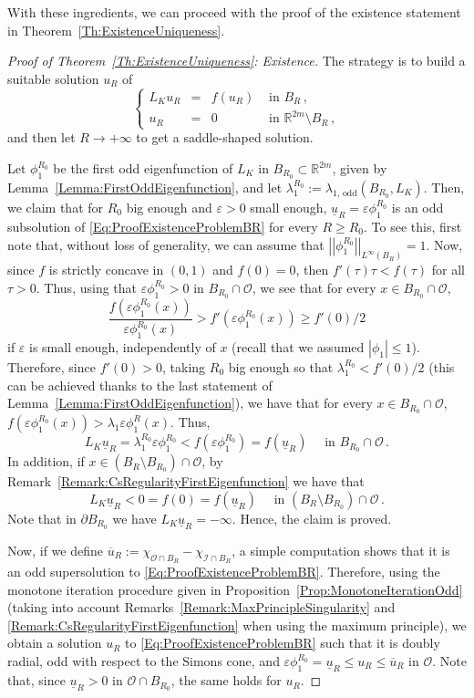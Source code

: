 \documentclass[12pt,reqno]{amsart}
\theoremstyle{definition}
\theoremstyle{remark}
\newcommand{\con}[1]{\mathbb{#1}}
\newcommand{\R}{\con{R}} %
\newcommand{\ical}{\mathcal{I}}
\newcommand{\ocal}{\mathcal{O}}
\newcommand{\norm}[1]{\left | \left |{#1} \right | \right |}
\newcommand\beqc[1]{\left\{\begin{array}{#1}}
\newcommand\eeqc{\end{array} \right.}
\def\PDEsystem{rcll}
\newcommand{\usub}{\underline{u}}
\newcommand{\usup}{\overline{u}}
\numberwithin{equation}{section}
\begin{document}
With these ingredients, we can proceed with the proof of the existence statement in Theorem~\ref{Th:ExistenceUniqueness}.

\begin{proof}[Proof of Theorem~\ref{Th:ExistenceUniqueness}: Existence]
	The strategy is to build a suitable solution $u_R$ of 
	\begin{equation}
	\label{Eq:ProofExistenceProblemBR}
	\beqc{\PDEsystem}
	L_K u_R &=& f(u_R) & \textrm{ in } B_R\,,\\
	u_R &=& 0 & \textrm{ in }\R^{2m} \setminus B_R\,,
	\eeqc
	\end{equation}
	and then let $R\to+ \infty$ to get a saddle-shaped solution.
	
	Let $\phi_1^{R_0}$ be the first odd eigenfunction of $L_K$ in $B_{R_0} \subset \R^{2m}$, given by Lemma~\ref{Lemma:FirstOddEigenfunction}, and let  $\lambda_1^{R_0} := \lambda_{1, \, \mathrm{odd}}(B_{R_0}, L_K)$. Then, we claim that for $R_0$ big enough and $\varepsilon>0$ small enough, $\usub_R = \varepsilon\phi_1^{R_0} $ is an odd subsolution of \eqref{Eq:ProofExistenceProblemBR} for every $R\geq R_0$. To see this, first note that, without loss of generality, we can assume that $\norm{\phi_1^{R_0}}_{L^\infty(B_R)}=1$. Now, since $f$ is strictly concave in $(0,1)$ and $f(0)=0$, then $f'(\tau)\tau<f(\tau)$ for all $\tau>0$. Thus, using that $\varepsilon \phi_1^{R_0}>0$ in $B_{R_0}\cap \ocal$, we see that for every $x\in B_{R_0}\cap \ocal$,
	$$
	\dfrac{f(\varepsilon \phi_1^{R_0}(x))}{\varepsilon \phi_1^{R_0}(x)} > f'(\varepsilon \phi_1^{R_0}(x)) \geq f'(0)/2
	$$
	if $\varepsilon$ is small enough, independently of $x$ (recall that we assumed $|\phi_1|\leq 1$). Therefore, since $f'(0)>0$, taking $R_0$ big enough so that $\lambda_1^{R_0} < f'(0)/2$ (this can be achieved thanks to the last statement of Lemma~\ref{Lemma:FirstOddEigenfunction}), we have that for every $x\in B_{R_0}\cap \ocal$,  $f(\varepsilon \phi_1^{R_0}(x)) > \lambda_1 \varepsilon \phi_1^R(x)$. Thus,
	$$
	L_K \usub_R = \lambda_1^{R_0} \varepsilon \phi_1^{R_0} < f(\varepsilon\phi_1^{R_0}) = f(\usub_R) \quad \textrm{ in } B_{R_0}\cap \ocal\,.
	$$
	In addition, if $x\in (B_R\setminus B_{R_0})\cap\ocal$, by Remark~\ref{Remark:CsRegularityFirstEigenfunction} we have that
	$$
	L_K \usub_R < 0 = f(0) =  f(\usub_R) \quad \textrm{ in } (B_R\setminus B_{R_0})\cap \ocal\,.
	$$
	Note that in $\partial B_{R_0}$ we have $L_K \usub_R = -\infty$. Hence, the claim is proved.
	
	Now, if we define $\usup_R := \chi_{\ocal \cap B_R} - \chi_{\ical \cap B_R}$, a simple computation shows that it is an odd supersolution to \eqref{Eq:ProofExistenceProblemBR}. Therefore, using the monotone iteration procedure given in Proposition~\ref{Prop:MonotoneIterationOdd} (taking into account Remarks~\ref{Remark:MaxPrincipleSingularity} and \ref{Remark:CsRegularityFirstEigenfunction} when using the maximum principle), we obtain a solution $u_R$ to \eqref{Eq:ProofExistenceProblemBR} such that it is doubly radial, odd with respect to the Simons cone, and $\varepsilon \phi_1^{R_0} = \usub_R \leq u_R \leq \usup_R$ in $\ocal$. Note that, since $\usub_R > 0$ in $\ocal \cap B_{R_0}$, the same holds for $u_R$.
	

\end{proof}
\end{document}
